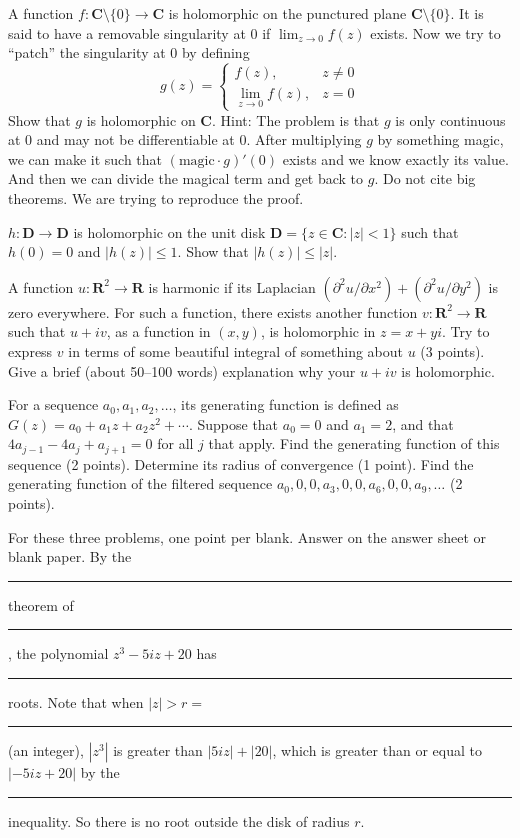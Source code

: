 \documentclass[a4paper]{article}
\def\CC{\mathbf C}
\def\DD{\mathbf D}
\def\RR{\mathbf R}
\begin{document}
\Problem
A function $f: \CC \setminus \{0\} \to \CC$
is holomorphic on the punctured plane $\CC \setminus \{0\}$.
It is said to have a removable singularity at $0$
if $\lim_{z \to 0} f(z)$ exists.
Now we try to ``patch'' the singularity at $0$
by defining
\[
    g(z) =
    \begin{cases}
        f(z), & z \neq 0 \\
        \lim_{z \to 0} f(z), & z = 0
    \end{cases}
\]
Show that $g$ is holomorphic on $\CC$.
Hint:
The problem is that $g$ is only continuous at $0$
and may not be differentiable at $0$.
After multiplying $g$ by something magic,
we can make it such that $(\text{magic} \cdot g)'(0)$ exists
and we know exactly its value.
And then we can divide the magical term and get back to $g$.
Do not cite big theorems.
We are trying to reproduce the proof.

\Problem 
$h: \DD \to \DD$ is holomorphic on the unit disk
$\DD = \{z \in \CC : |z| < 1\}$ such that $h(0) = 0$ and $|h(z)| \le 1$.
Show that $|h(z)| \le|z|$.

\Problem
A function $u: \RR^2 \to \RR$ is harmonic if its Laplacian
$(\partial^2 u/\partial x^2) + (\partial^2 u/\partial y^2)$
is zero everywhere.
For such a function, there exists another function $v: \RR^2 \to \RR$
such that $u + iv$, as a function in $(x, y)$,
is holomorphic in $z = x + yi$.
Try to express $v$ in terms of
some beautiful integral of something about $u$ (3 points).
Give a brief (about 50--100 words) explanation
why your $u + iv$ is holomorphic.

\Problem
For a sequence $a_0, a_1, a_2, \dotsc$, its generating function
is defined as $G(z) = a_0 + a_1 z + a_2 z^2 + \dotsb$.
Suppose that $a_0 = 0$ and $a_1 = 2$,
and that $4a_{j-1} - 4 a_j + a_{j+1} = 0$ for all $j$ that apply.
Find the generating function of this sequence (2 points).
Determine its radius of convergence (1 point).
Find the generating function of the filtered sequence
$a_0, 0, 0, a_3, 0, 0, a_6, 0, 0, a_9, \dotsc$ (2 points).

\Problem
For these three problems, one point per blank.
Answer on the answer sheet or blank paper.
By the \rule{3em}{0.4pt} theorem of \rule{3em}{0.4pt},
the polynomial $z^3 - 5iz + 20$ has \rule{3em}{0.4pt} roots.
Note that when $|z| > r =$ \rule{3em}{0.4pt} (an integer),
$|z^3|$ is greater than $|5iz| + |20|$,
which is greater than or equal to $|{-5iz + 20}|$
by the \rule{3em}{0.4pt} inequality.
So there is no root outside the disk of radius $r$.
\end{document}
